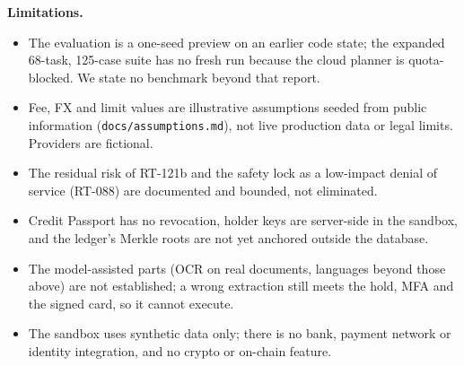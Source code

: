 \documentclass[11pt,a4paper]{article}
\newcommand{\code}[1]{\texttt{\small #1}}
\begin{document}
\textbf{Limitations.}\nopagebreak[4]
\begin{itemize}
\item The evaluation is a one-seed preview on an earlier code state; the expanded 68-task, 125-case suite has no fresh run because the cloud planner is quota-blocked. We state no benchmark beyond that report.
\item Fee, FX and limit values are illustrative assumptions seeded from public information (\code{docs/\allowbreak assumptions.md}), not live production data or legal limits. Providers are fictional.
\item The residual risk of RT-121b and the safety lock as a low-impact denial of service (RT-088) are documented and bounded, not eliminated.
\item Credit Passport has no revocation, holder keys are server-side in the sandbox, and the ledger's Merkle roots are not yet anchored outside the database.
\item The model-assisted parts (OCR on real documents, languages beyond those above) are not established; a wrong extraction still meets the hold, MFA and the signed card, so it cannot execute.
\item The sandbox uses synthetic data only; there is no bank, payment network or identity integration, and no crypto or on-chain feature.
\end{itemize}


{\footnotesize}
\nocite{saltzer1975protection,debenedetti2025camel,beurerkellner2025patterns}
\end{document}
